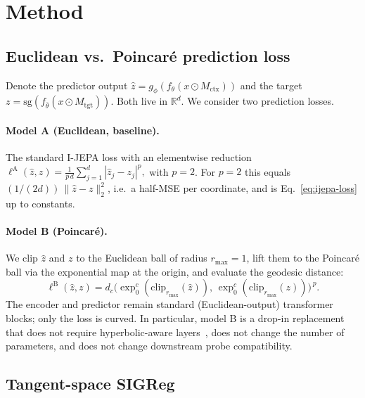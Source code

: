 \documentclass{article}
\begin{document}
\section{Method}
\label{sec:method}

\subsection{Euclidean vs.\ Poincar\'{e} prediction loss}
\label{sec:method:losses}

Denote the predictor output $\hat z = g_\phi(f_\theta(x \odot M_{\text{ctx}}))$ and the target $z = \mathrm{sg}(f_{\bar\theta}(x \odot M_{\text{tgt}}))$. Both live in $\mathbb{R}^d$. We consider two prediction losses.

\paragraph{Model A (Euclidean, baseline).} The standard I-JEPA loss with an elementwise reduction
$
  \ell^{\text{A}}(\hat z, z) = \tfrac{1}{p\,d}\sum_{j=1}^d |\hat z_j - z_j|^p,
$
with $p{=}2$. For $p{=}2$ this equals $(1/(2d))\,\|\hat z - z\|_2^2$, i.e.\ a half-MSE per coordinate, and is Eq.~\ref{eq:ijepa-loss} up to constants.

\paragraph{Model B (Poincar\'{e}).} We clip $\hat z$ and $z$ to the Euclidean ball of radius $r_{\max}{=}1$, lift them to the Poincar\'{e} ball via the exponential map at the origin, and evaluate the geodesic distance:
\begin{equation}
  \ell^{\text{B}}(\hat z, z) = d_c\bigl(\exp^c_0(\mathrm{clip}_{r_{\max}}(\hat z)),\, \exp^c_0(\mathrm{clip}_{r_{\max}}(z))\bigr)^{\,p}.
  \label{eq:loss-B}
\end{equation}
The encoder and predictor remain standard (Euclidean-output) transformer blocks; only the loss is curved. In particular, model B is a drop-in replacement that does not require hyperbolic-aware layers~\citep{ganea2018hyperbolic,vanspengler2023poincareresnet}, does not change the number of parameters, and does not change downstream probe compatibility.

\subsection{Tangent-space SIGReg}
\label{sec:method:tangent-sigreg}
\end{document}
